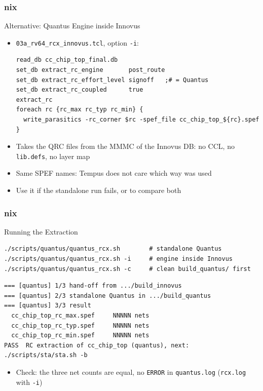\documentclass{beamer}
\newcommand{\astitle}{nix}
\newcommand{\assubtitle}{nix}
\newcommand{\cmd}[1]{\texttt{#1}}
\begin{document}
\renewcommand{\assubtitle}{Alternative: Quantus Engine inside Innovus}
\begin{frame}[fragile]
\frametitle{\astitle}
\begin{block}{\assubtitle}
  \begin{itemize}
    \item \cmd{03a\_rv64\_rcx\_innovus.tcl}, option \cmd{-i}:
\begin{lstlisting}[style=sh]
read_db cc_chip_top_final.db
set_db extract_rc_engine       post_route
set_db extract_rc_effort_level signoff   ;# = Quantus
set_db extract_rc_coupled      true
extract_rc
foreach rc {rc_max rc_typ rc_min} {
  write_parasitics -rc_corner $rc -spef_file cc_chip_top_${rc}.spef
}
\end{lstlisting}
    \item Takes the QRC files from the MMMC of the Innovus DB: no CCL, no
      \cmd{lib.defs}, no layer map
    \item Same SPEF names: Tempus does not care which way was used
    \item Use it if the standalone run fails, or to compare both
  \end{itemize}
\end{block}
\end{frame}

\renewcommand{\assubtitle}{Running the Extraction}
\begin{frame}[fragile]
\frametitle{\astitle}
\begin{block}{\assubtitle}
\begin{lstlisting}[style=sh]
./scripts/quantus/quantus_rcx.sh        # standalone Quantus
./scripts/quantus/quantus_rcx.sh -i     # engine inside Innovus
./scripts/quantus/quantus_rcx.sh -c     # clean build_quantus/ first
\end{lstlisting}
\begin{lstlisting}[style=out]
=== [quantus] 1/3 hand-off from .../build_innovus
=== [quantus] 2/3 standalone Quantus in .../build_quantus
=== [quantus] 3/3 result
  cc_chip_top_rc_max.spef     NNNNN nets
  cc_chip_top_rc_typ.spef     NNNNN nets
  cc_chip_top_rc_min.spef     NNNNN nets
PASS  RC extraction of cc_chip_top (quantus), next: ./scripts/sta/sta.sh -b
\end{lstlisting}
  \begin{itemize}
    \item Check: the three net counts are equal, no \cmd{ERROR} in
      \cmd{quantus.log} (\cmd{rcx.log} with \cmd{-i})
  \end{itemize}
\end{block}
\end{frame}
\end{document}
